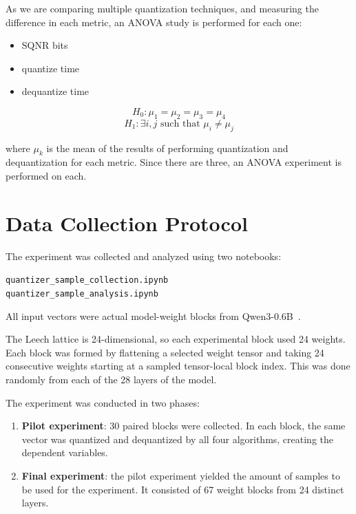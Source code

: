 \documentclass[11pt]{article}
\begin{document}
As we are comparing multiple quantization techniques, and measuring the difference in each metric, an ANOVA study is performed for each one:

\begin{itemize}
    \item SQNR bits
    \item quantize time
    \item dequantize time
\end{itemize}

\[
H_0: \mu_1 = \mu_2 = \mu_3 = \mu_4
\]
\[
H_1: \exists i,j \text{ such that } \mu_i \neq \mu_j
\]

where \(\mu_k\) is the mean of the results of performing quantization and dequantization for each metric. Since there are three, an ANOVA experiment is performed on each.


\section{Data Collection Protocol}

The experiment was collected and analyzed using two notebooks:

\begin{center}
\small\texttt{quantizer\_sample\_collection.ipynb}\\
\small\texttt{quantizer\_sample\_analysis.ipynb}
\end{center}

All input vectors were actual model-weight blocks from Qwen3-0.6B~\cite{qwen3}.

The Leech lattice is 24-dimensional, so each experimental block used 24 weights. Each block was formed by flattening a selected weight tensor and taking 24 consecutive weights starting at a sampled tensor-local block index. This was done randomly from each of the 28 layers of the model.

The experiment was conducted in two phases:

\begin{enumerate}
    \item \textbf{Pilot experiment}: 30 paired blocks were collected. In each block, the same vector was quantized and dequantized by all four algorithms, creating the dependent variables.
    \item \textbf{Final experiment}: the pilot experiment yielded the amount of samples to be used for the experiment. It consisted of 67 weight blocks from 24 distinct layers.
\end{enumerate}
\end{document}
